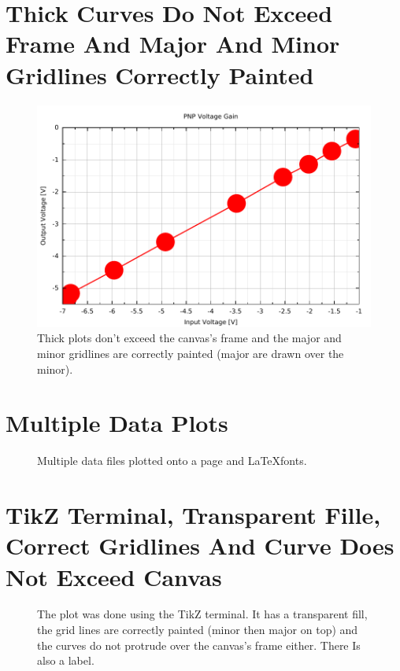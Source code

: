 \documentclass[10pt,a4paper,final]{report}
\begin{document}
\section{Thick Curves Do Not Exceed Frame And Major And Minor Gridlines Correctly Painted}
\begin{figure}[!hbtp]
\centering
\includegraphics[width=\textwidth]{../Code/ElectronicCircuitsLab3/ElectronicCircuitsLab3.pdf}
\caption{Thick plots don't exceed the canvas's frame and the major and minor gridlines are correctly painted (major are drawn over the minor).}
\end{figure}


\section{Multiple Data Plots}
\begin{figure}[!htbp]
\begin{center}
\resizebox{\columnwidth}{!}{}
\caption{Multiple data files plotted onto a page and \LaTeX fonts.}
\label{fig:Motor}
\end{center}
\end{figure}



\section{TikZ Terminal, Transparent Fille, Correct Gridlines And Curve Does Not Exceed Canvas}
\begin{figure}[htbp]
\begin{center}
\resizebox{\columnwidth}{!}{}
\caption{The plot was done using the TikZ terminal.  It has a transparent fill, the grid lines are correctly painted (minor then major on top) and the curves do not protrude over the canvas's frame either.  There Is also a label.}
\label{fig:AnimationMosfetClassAB}
\end{center}
\end{figure}

\end{document}
